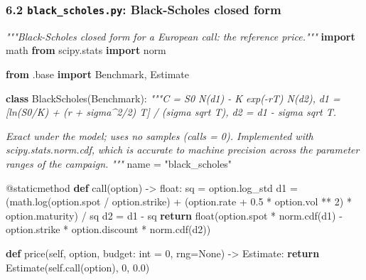 \documentclass[
  10pt,
]{article}
\newenvironment{Shaded}{}{}
\newcommand{\AttributeTok}[1]{\textcolor[rgb]{0.49,0.56,0.16}{#1}}
\newcommand{\BuiltInTok}[1]{\textcolor[rgb]{0.00,0.50,0.00}{#1}}
\newcommand{\CommentTok}[1]{\textcolor[rgb]{0.38,0.63,0.69}{\textit{#1}}}
\newcommand{\ControlFlowTok}[1]{\textcolor[rgb]{0.00,0.44,0.13}{\textbf{#1}}}
\newcommand{\DecValTok}[1]{\textcolor[rgb]{0.25,0.63,0.44}{#1}}
\newcommand{\FloatTok}[1]{\textcolor[rgb]{0.25,0.63,0.44}{#1}}
\newcommand{\ImportTok}[1]{\textcolor[rgb]{0.00,0.50,0.00}{\textbf{#1}}}
\newcommand{\KeywordTok}[1]{\textcolor[rgb]{0.00,0.44,0.13}{\textbf{#1}}}
\newcommand{\NormalTok}[1]{#1}
\newcommand{\OperatorTok}[1]{\textcolor[rgb]{0.40,0.40,0.40}{#1}}
\newcommand{\StringTok}[1]{\textcolor[rgb]{0.25,0.44,0.63}{#1}}
\newcommand{\VariableTok}[1]{\textcolor[rgb]{0.10,0.09,0.49}{#1}}
\begin{document}
\hypertarget{62-black_scholespy-black-scholes-closed-form}{%
\subsubsection{\texorpdfstring{6.2 \texttt{black\_scholes.py}:
Black-Scholes closed
form}{6.2 black\_scholes.py: Black-Scholes closed form}}\label{62-black_scholespy-black-scholes-closed-form}}

\begin{Shaded}
\begin{Highlighting}[]
\CommentTok{"""Black{-}Scholes closed form for a European call: the reference price."""}
\ImportTok{import}\NormalTok{ math}
\ImportTok{from}\NormalTok{ scipy.stats }\ImportTok{import}\NormalTok{ norm}

\ImportTok{from}\NormalTok{ .base }\ImportTok{import}\NormalTok{ Benchmark, Estimate}


\KeywordTok{class}\NormalTok{ BlackScholes(Benchmark):}
    \CommentTok{"""C = S0 N(d1) {-} K exp({-}rT) N(d2),}
\CommentTok{    d1 = [ln(S0/K) + (r + sigma\^{}2/2) T] / (sigma sqrt T),  d2 = d1 {-} sigma sqrt T.}

\CommentTok{    Exact under the model; uses no samples (calls = 0). Implemented with scipy.stats.norm.cdf,}
\CommentTok{    which is accurate to machine precision across the parameter ranges of the campaign.}
\CommentTok{    """}
\NormalTok{    name }\OperatorTok{=} \StringTok{"black\_scholes"}

    \AttributeTok{@staticmethod}
    \KeywordTok{def}\NormalTok{ call(option) }\OperatorTok{{-}\textgreater{}} \BuiltInTok{float}\NormalTok{:}
\NormalTok{        sq }\OperatorTok{=}\NormalTok{ option.log\_std}
\NormalTok{        d1 }\OperatorTok{=}\NormalTok{ (math.log(option.spot }\OperatorTok{/}\NormalTok{ option.strike) }\OperatorTok{+}\NormalTok{ (option.rate }\OperatorTok{+} \FloatTok{0.5} \OperatorTok{*}\NormalTok{ option.vol }\OperatorTok{**} \DecValTok{2}\NormalTok{) }\OperatorTok{*}\NormalTok{ option.maturity) }\OperatorTok{/}\NormalTok{ sq}
\NormalTok{        d2 }\OperatorTok{=}\NormalTok{ d1 }\OperatorTok{{-}}\NormalTok{ sq}
        \ControlFlowTok{return} \BuiltInTok{float}\NormalTok{(option.spot }\OperatorTok{*}\NormalTok{ norm.cdf(d1) }\OperatorTok{{-}}\NormalTok{ option.strike }\OperatorTok{*}\NormalTok{ option.discount }\OperatorTok{*}\NormalTok{ norm.cdf(d2))}

    \KeywordTok{def}\NormalTok{ price(}\VariableTok{self}\NormalTok{, option, budget: }\BuiltInTok{int} \OperatorTok{=} \DecValTok{0}\NormalTok{, rng}\OperatorTok{=}\VariableTok{None}\NormalTok{) }\OperatorTok{{-}\textgreater{}}\NormalTok{ Estimate:}
        \ControlFlowTok{return}\NormalTok{ Estimate(}\VariableTok{self}\NormalTok{.call(option), }\DecValTok{0}\NormalTok{, }\FloatTok{0.0}\NormalTok{)}
\end{Highlighting}
\end{Shaded}
\end{document}
